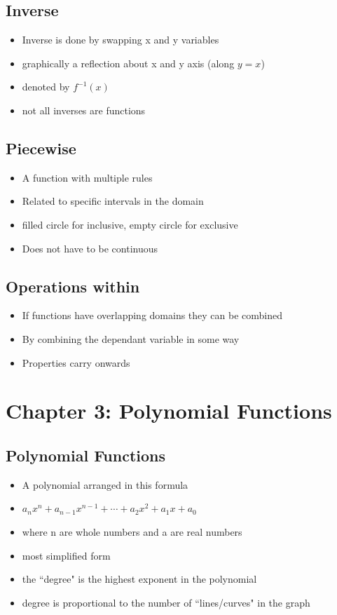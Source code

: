 \documentclass{article}
\begin{document}
    \subsection{Inverse}
    \begin{itemize}
        \item Inverse is done by swapping x and y variables
        \item graphically a reflection about x and y axis (along $y=x$)
        \item denoted by $f^{-1}(x)$
        \item not all inverses are functions
    \end{itemize}

    \subsection{Piecewise}
    \begin{itemize}
        \item A function with multiple rules
        \item Related to specific intervals in the domain
        \item filled circle for inclusive, empty circle for exclusive
        \item Does not have to be continuous 
    \end{itemize}

    \subsection{Operations within}
    \begin{itemize}
        \item If functions have overlapping domains they can be combined
        \item By combining the dependant variable in some way
        \item Properties carry onwards
    \end{itemize}

    \section{Chapter 3: Polynomial Functions}

    \subsection{Polynomial Functions}
    \begin{itemize}
        \item A polynomial arranged in this formula
        \item $a_nx^n + a_{n-1}x^{n-1} + \cdots + a_2x^2 + a_1x + a_0$
        \item where n are whole numbers and a are real numbers
        \item most simplified form
        \item the ``degree" is the highest exponent in the polynomial
        \item degree is proportional to the number of ``lines/curves" in the graph
    \end{itemize}
\end{document}
